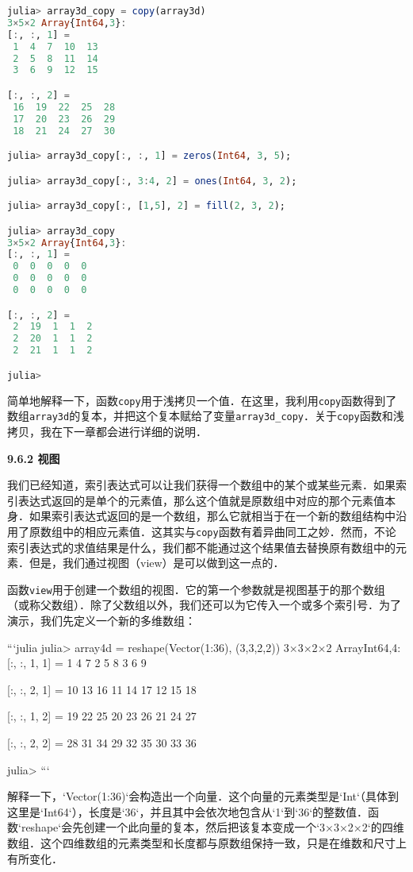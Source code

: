 \begin{lstlisting}[language=julia]
julia> array3d_copy = copy(array3d)
3×5×2 Array{Int64,3}:
[:, :, 1] =
 1  4  7  10  13
 2  5  8  11  14
 3  6  9  12  15

[:, :, 2] =
 16  19  22  25  28
 17  20  23  26  29
 18  21  24  27  30

julia> array3d_copy[:, :, 1] = zeros(Int64, 3, 5);

julia> array3d_copy[:, 3:4, 2] = ones(Int64, 3, 2);

julia> array3d_copy[:, [1,5], 2] = fill(2, 3, 2);

julia> array3d_copy
3×5×2 Array{Int64,3}:
[:, :, 1] =
 0  0  0  0  0
 0  0  0  0  0
 0  0  0  0  0

[:, :, 2] =
 2  19  1  1  2
 2  20  1  1  2
 2  21  1  1  2

julia> 
\end{lstlisting}

简单地解释一下，函数\verb|copy|用于浅拷贝一个值．在这里，我利用\verb|copy|函数得到了数组\verb|array3d|的复本，并把这个复本赋给了变量\verb|array3d_copy|．关于\verb|copy|函数和浅拷贝，我在下一章都会进行详细的说明．

\textbf{9.6.2 视图}

我们已经知道，索引表达式可以让我们获得一个数组中的某个或某些元素．如果索引表达式返回的是单个的元素值，那么这个值就是原数组中对应的那个元素值本身．如果索引表达式返回的是一个数组，那么它就相当于在一个新的数组结构中沿用了原数组中的相应元素值．这其实与\verb|copy|函数有着异曲同工之妙．然而，不论索引表达式的求值结果是什么，我们都不能通过这个结果值去替换原有数组中的元素．但是，我们通过视图（view）是可以做到这一点的．

函数\verb|view|用于创建一个数组的视图．它的第一个参数就是视图基于的那个数组（或称父数组）．除了父数组以外，我们还可以为它传入一个或多个索引号．为了演示，我们先定义一个新的多维数组：

```julia
julia> array4d = reshape(Vector(1:36), (3,3,2,2))
3×3×2×2 Array{Int64,4}:
[:, :, 1, 1] =
 1  4  7
 2  5  8
 3  6  9

[:, :, 2, 1] =
 10  13  16
 11  14  17
 12  15  18

[:, :, 1, 2] =
 19  22  25
 20  23  26
 21  24  27

[:, :, 2, 2] =
 28  31  34
 29  32  35
 30  33  36

julia> 
```

解释一下，`Vector(1:36)`会构造出一个向量．这个向量的元素类型是`Int`（具体到这里是`Int64`），长度是`36`，并且其中会依次地包含从`1`到`36`的整数值．函数`reshape`会先创建一个此向量的复本，然后把该复本变成一个`3×3×2×2`的四维数组．这个四维数组的元素类型和长度都与原数组保持一致，只是在维数和尺寸上有所变化．

